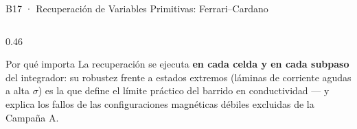 \documentclass[aspectratio=169,9pt]{beamer}
\begin{document}
\begin{frame}{B17 · Recuperaci\'on de Variables Primitivas: Ferrari--Cardano}
\begin{columns}[T]
\begin{column}{0.46\textwidth}
\begin{tcolorbox}[WRN={Guardias f\'isicas del algoritmo}]
\begin{itemize}
    \end{itemize}
  \end{tcolorbox}
  \vspace{0.12cm}
  \begin{block}{Por qu\'e importa}
    \scriptsize
    La recuperaci\'on se ejecuta \textbf{en cada celda y en cada subpaso}
    del integrador: su robustez frente a estados extremos (l\'aminas de
    corriente agudas a alta $\sigma$) es la que define el l\'imite pr\'actico
    del barrido en conductividad --- y explica los fallos de las
    configuraciones magn\'eticas d\'ebiles excluidas de la Campa\~na A.
  \end{block}
\end{column}
\end{columns}
\end{frame}
\end{document}
